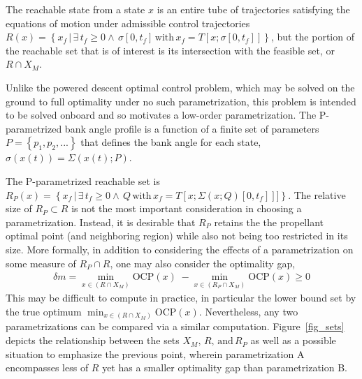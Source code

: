 \documentclass[letterpaper, preprint, paper,11pt]{AAS}
\begin{document}



The reachable state from a state $x$ is an entire tube of trajectories satisfying the equations of motion under admissible control trajectories $R(x)=\left\{x_f \,| \,\exists\, t_f \ge 0 \land\, \sigma[0,t_f] \,\mathrm{with}\, x_f = T[x; \sigma[0,t_f]]  \right\}$, but the portion of the reachable set that is of interest is its intersection with the feasible set, or $R \cap X_M$.

Unlike the powered descent optimal control problem, which may be solved on the ground to full optimality under no such parametrization, this problem is intended to be solved onboard and so motivates a low-order parametrization. The P-parametrized bank angle profile is a function of a finite set of parameters $P = \left\{p_1, p_2, ... \right\}$ that defines the bank angle for each state, $\sigma(x(t)) = \Sigma(x(t); P)$.

The P-parametrized reachable set is $R_P(x) =\left\{x_f \,| \,\exists\, t_f \ge 0 \land\, Q \,\mathrm{with}\, x_f = T[x; \Sigma(x; Q)[0,t_f]]]  \right\} $. The relative size of $R_P \subset R$ is not the most important consideration in choosing a parametrization. Instead, it is desirable that $R_P$ retains the the propellant optimal point (and neighboring region) while also not being too restricted in its size. More formally, in addition to considering the effects of a parametrization on some measure of $R_P\cap R$, one may also consider the optimality gap, 
\begin{align}
\delta m = \min_{x\in (R\cap X_M)} \mathrm{OCP}(x)\; - \min_{x\in (R_P\cap X_M)} \mathrm{OCP}(x) \ge 0
\end{align}
This may be difficult to compute in practice, in particular the lower bound set by the true optimum $\min_{x\in (R\cap X_M)} \mathrm{OCP}(x)$. Nevertheless, any two parametrizations can be compared via a similar computation. 
Figure~\ref{fig_sets} depicts the relationship between the sets $X_M,\,R,\,\mathrm{and}\,R_P$ as well as a possible situation to emphasize the previous point, wherein parametrization A encompasses less of $R$ yet has a smaller optimality gap than parametrization B. 
\end{document}
